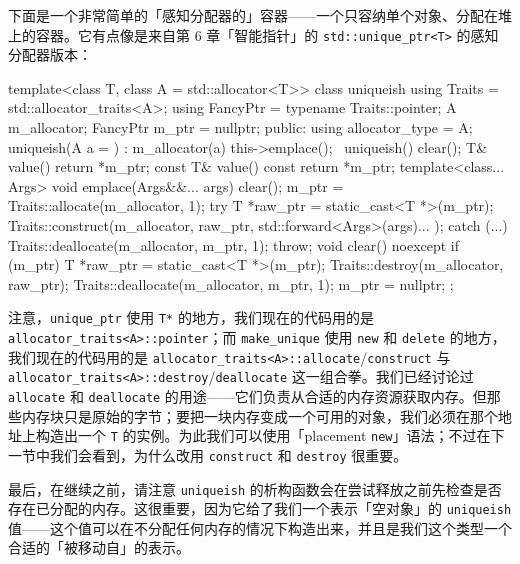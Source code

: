 下面是一个非常简单的「感知分配器的」容器——一个只容纳单个对象、分配在堆上的容器。它有点像是来自第 6 章「智能指针」的 \texttt{std::\allowbreak{}unique\_\allowbreak{}ptr<\allowbreak{}T>\allowbreak{}} 的感知分配器版本：

\begin{codebox}[cpp]
    template<class T, class A = std::allocator<T>>
    class uniqueish {
      using Traits = std::allocator_traits<A>;
      using FancyPtr = typename Traits::pointer;
      A m_allocator;
      FancyPtr m_ptr = nullptr;
    public:
      using allocator_type = A;
      uniqueish(A a = {}) : m_allocator(a) {
        this->emplace();
      }
      ~uniqueish() {
        clear();
      }
      T& value() { return *m_ptr; }
      const T& value() const { return *m_ptr; }
      template<class... Args>
      void emplace(Args&&... args) {
        clear();
        m_ptr = Traits::allocate(m_allocator, 1);
        try {
          T *raw_ptr = static_cast<T *>(m_ptr);
          Traits::construct(m_allocator, raw_ptr,
              std::forward<Args>(args)...
          );
        } catch (...) {
          Traits::deallocate(m_allocator, m_ptr, 1);
          throw;
        }
      }
      void clear() noexcept {
        if (m_ptr) {
          T *raw_ptr = static_cast<T *>(m_ptr);
          Traits::destroy(m_allocator, raw_ptr);
          Traits::deallocate(m_allocator, m_ptr, 1);
          m_ptr = nullptr;
        }
      }
    };
\end{codebox}

注意，\texttt{unique\_\allowbreak{}ptr} 使用 \texttt{T*} 的地方，我们现在的代码用的是 \texttt{allocator\_\allowbreak{}traits<\allowbreak{}A>\allowbreak{}::\allowbreak{}pointer}；而 \texttt{make\_\allowbreak{}unique} 使用 \texttt{new} 和 \texttt{delete} 的地方，我们现在的代码用的是 \texttt{allocator\_\allowbreak{}traits<\allowbreak{}A>\allowbreak{}::\allowbreak{}allocate}/\texttt{construct} 与 \texttt{allocator\_\allowbreak{}traits<\allowbreak{}A>\allowbreak{}::\allowbreak{}destroy}/\texttt{deallocate} 这一组合拳。我们已经讨论过 \texttt{allocate} 和 \texttt{deallocate} 的用途——它们负责从合适的内存资源获取内存。但那些内存块只是原始的字节；要把一块内存变成一个可用的对象，我们必须在那个地址上构造出一个 \texttt{T} 的实例。为此我们可以使用「placement \texttt{new}」语法；不过在下一节中我们会看到，为什么改用 \texttt{construct} 和 \texttt{destroy} 很重要。

最后，在继续之前，请注意 \texttt{uniqueish} 的析构函数会在尝试释放之前先检查是否存在已分配的内存。这很重要，因为它给了我们一个表示「空对象」的 \texttt{uniqueish} 值——这个值可以在不分配任何内存的情况下构造出来，并且是我们这个类型一个合适的「被移动自」的表示。

